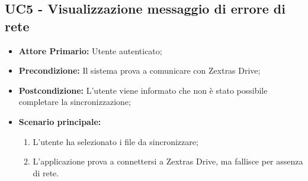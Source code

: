 \subsection{UC5 - Visualizzazione messaggio di errore di rete}
\label{UC5}
\begin{itemize}
\item \textbf{Attore Primario:} Utente autenticato;
\item \textbf{Precondizione:} Il sistema prova a comunicare con Zextras Drive;
\item \textbf{Postcondizione:} L'utente viene informato che non è stato possibile completare la sincronizzazione;
\item \textbf{Scenario principale:}
    \begin{enumerate}
    \item L'utente ha selezionato i file da sincronizzare;
    \item L'applicazione prova a connettersi a Zextras Drive, ma fallisce per assenza di rete.
    \end{enumerate}
\end{itemize}